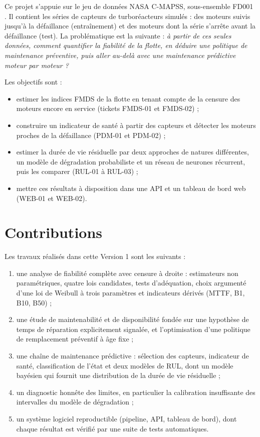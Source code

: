 Ce projet s'appuie sur le jeu de données NASA C-MAPSS, sous-ensemble FD001 \cite{saxena2008data,saxena2008damage}. Il contient les séries de capteurs de turboréacteurs simulés : des moteurs suivis jusqu'à la défaillance (entraînement) et des moteurs dont la série s'arrête avant la défaillance (test). La problématique est la suivante : \emph{à partir de ces seules données, comment quantifier la fiabilité de la flotte, en déduire une politique de maintenance préventive, puis aller au-delà avec une maintenance prédictive moteur par moteur ?}

Les objectifs sont :

\begin{itemize}
\item estimer les indices FMDS de la flotte en tenant compte de la censure des moteurs encore en service (tickets FMDS-01 et FMDS-02) ;
\item construire un indicateur de santé à partir des capteurs et détecter les moteurs proches de la défaillance (PDM-01 et PDM-02) ;
\item estimer la durée de vie résiduelle par deux approches de natures différentes, un modèle de dégradation probabiliste et un réseau de neurones récurrent, puis les comparer (RUL-01 à RUL-03) ;
\item mettre ces résultats à disposition dans une API et un tableau de bord web (WEB-01 et WEB-02).
\end{itemize}

\section{Contributions}\label{sec:contributions}

Les travaux réalisés dans cette Version 1 sont les suivants :

\begin{enumerate}
\item une analyse de fiabilité complète avec censure à droite : estimateurs non paramétriques, quatre lois candidates, tests d'adéquation, choix argumenté d'une loi de Weibull à trois paramètres et indicateurs dérivés (MTTF, B1, B10, B50) ;
\item une étude de maintenabilité et de disponibilité fondée sur une hypothèse de temps de réparation explicitement signalée, et l'optimisation d'une politique de remplacement préventif à âge fixe ;
\item une chaîne de maintenance prédictive : sélection des capteurs, indicateur de santé, classification de l'état et deux modèles de RUL, dont un modèle bayésien qui fournit une distribution de la durée de vie résiduelle ;
\item un diagnostic honnête des limites, en particulier la calibration insuffisante des intervalles du modèle de dégradation ;
\item un système logiciel reproductible (pipeline, API, tableau de bord), dont chaque résultat est vérifié par une suite de tests automatiques.
\end{enumerate}

